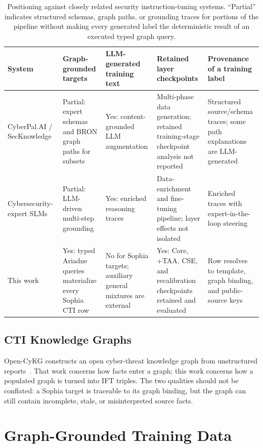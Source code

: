 \documentclass[conference]{IEEEtran}
\begin{document}
\begin{table}[t]
\caption{Positioning against closely related security instruction-tuning systems. ``Partial'' indicates structured schemas, graph paths, or grounding traces for portions of the pipeline without making every generated label the deterministic result of an executed typed graph query.}
\label{tab:related}
\centering
\scriptsize
\setlength{\tabcolsep}{3pt}
\begin{tabular}{@{}p{}p{}p{}p{}p{}@{}}
\toprule
System & Graph-grounded targets & LLM-generated training text & Retained layer checkpoints & Provenance of a training label \\
\midrule
CyberPal.AI / SecKnowledge~\cite{levi2025cyberpal} & Partial: expert schemas and BRON graph paths for subsets & Yes: content-grounded LLM augmentation & Multi-phase data generation; retained training-stage checkpoint analysis not reported & Structured source/schema traces; some path explanations are LLM-generated \\
Cybersecurity-expert SLMs~\cite{levi2025slm} & Partial: LLM-driven multi-step grounding & Yes: enriched reasoning traces & Data-enrichment and fine-tuning pipeline; layer effects not isolated & Enriched traces with expert-in-the-loop steering \\
This work & Yes: typed Ariadne queries materialize every Sophia CTI row & No for Sophia targets; auxiliary general mixtures are external & Yes: Core, +TAA, CSE, and recalibration checkpoints retained and evaluated & Row resolves to template, graph binding, and public-source keys \\
\bottomrule
\end{tabular}
\end{table}

\subsection{CTI Knowledge Graphs}
Open-CyKG constructs an open cyber-threat knowledge graph from unstructured reports~\cite{sarhan2021opencykg}. That work concerns how facts enter a graph; this work concerns how a populated graph is turned into IFT triples. The two qualities should not be conflated: a Sophia target is traceable to its graph binding, but the graph can still contain incomplete, stale, or misinterpreted source facts.

\section{Graph-Grounded Training Data}\label{sec:data}
\end{document}
